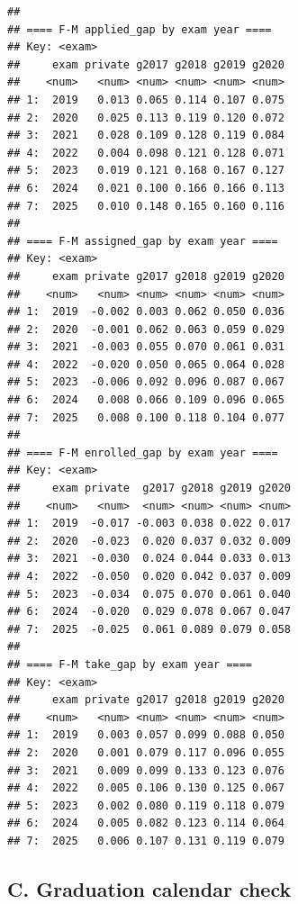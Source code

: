 \documentclass[
]{article}
\begin{document}
\begin{verbatim}
## 
## ==== F-M applied_gap by exam year ====
## Key: <exam>
##     exam private g2017 g2018 g2019 g2020
##    <num>   <num> <num> <num> <num> <num>
## 1:  2019   0.013 0.065 0.114 0.107 0.075
## 2:  2020   0.025 0.113 0.119 0.120 0.072
## 3:  2021   0.028 0.109 0.128 0.119 0.084
## 4:  2022   0.004 0.098 0.121 0.128 0.071
## 5:  2023   0.019 0.121 0.168 0.167 0.127
## 6:  2024   0.021 0.100 0.166 0.166 0.113
## 7:  2025   0.010 0.148 0.165 0.160 0.116
## 
## ==== F-M assigned_gap by exam year ====
## Key: <exam>
##     exam private g2017 g2018 g2019 g2020
##    <num>   <num> <num> <num> <num> <num>
## 1:  2019  -0.002 0.003 0.062 0.050 0.036
## 2:  2020  -0.001 0.062 0.063 0.059 0.029
## 3:  2021  -0.003 0.055 0.070 0.061 0.031
## 4:  2022  -0.020 0.050 0.065 0.064 0.028
## 5:  2023  -0.006 0.092 0.096 0.087 0.067
## 6:  2024   0.008 0.066 0.109 0.096 0.065
## 7:  2025   0.008 0.100 0.118 0.104 0.077
## 
## ==== F-M enrolled_gap by exam year ====
## Key: <exam>
##     exam private  g2017 g2018 g2019 g2020
##    <num>   <num>  <num> <num> <num> <num>
## 1:  2019  -0.017 -0.003 0.038 0.022 0.017
## 2:  2020  -0.023  0.020 0.037 0.032 0.009
## 3:  2021  -0.030  0.024 0.044 0.033 0.013
## 4:  2022  -0.050  0.020 0.042 0.037 0.009
## 5:  2023  -0.034  0.075 0.070 0.061 0.040
## 6:  2024  -0.020  0.029 0.078 0.067 0.047
## 7:  2025  -0.025  0.061 0.089 0.079 0.058
## 
## ==== F-M take_gap by exam year ====
## Key: <exam>
##     exam private g2017 g2018 g2019 g2020
##    <num>   <num> <num> <num> <num> <num>
## 1:  2019   0.003 0.057 0.099 0.088 0.050
## 2:  2020   0.001 0.079 0.117 0.096 0.055
## 3:  2021   0.009 0.099 0.133 0.123 0.076
## 4:  2022   0.005 0.106 0.130 0.125 0.067
## 5:  2023   0.002 0.080 0.119 0.118 0.079
## 6:  2024   0.005 0.082 0.123 0.114 0.064
## 7:  2025   0.006 0.107 0.131 0.119 0.079
\end{verbatim}

\hypertarget{c.-graduation-calendar-check}{%
\subsection{C. Graduation calendar
check}\label{c.-graduation-calendar-check}}
\end{document}
